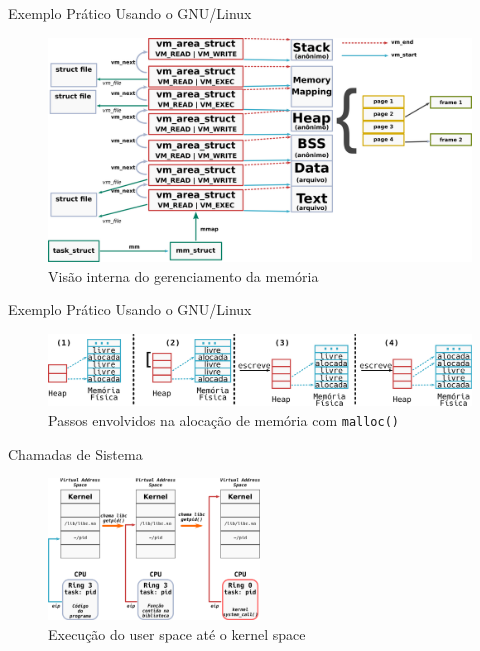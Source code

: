 \documentclass[xcolor={usenames,svgnames,dvipsnames},brazil,english,12pt,aspectratio=149]{beamer}
\begin{document}
\begin{frame}{Exemplo Prático Usando o GNU/Linux}
	\begin{figure}[!h]
		\centering
		\includegraphics[width=.9\textwidth]{kernel_manages_memory}
		\caption{Visão interna do gerenciamento da memória}
		\label{fig:kernel_manages_memory}
	\end{figure}
\end{frame}

\begin{frame}{Exemplo Prático Usando o GNU/Linux}
	\begin{figure}[!h]
		\centering
		\includegraphics[width=\textwidth]{malloc}
		\caption{Passos envolvidos na alocação de memória com \texttt{malloc()}}
		\label{fig:malloc_linux}
	\end{figure}
\end{frame}

\begin{frame}{Chamadas de Sistema}
	\begin{figure}[!h]
		\centering
		\includegraphics[width=0.5\textwidth]{userspace_to_kernel} 
		\caption{Execução do user space até o kernel space}
		\label{fig:userspace_kernelspace}
	\end{figure}
\end{frame}
\end{document}
